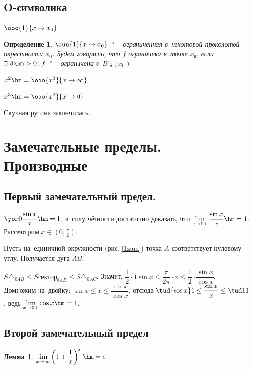 \documentclass[a4paper,10pt,twoside]{article}
\newtheorem{Def}{Определение}[section]
\newtheorem{Th}{Лемма}[section]
\let\AVsection\section{}
\renewcommand\section{\newpage\scol\AVsection}
\newcommand{\scol}{  \renewcommand{\headrulewidth}{0.5pt}\fancyhead[RE,LO]{\thesection{} \leftmark} \fancyhead[LE,RO]{\thepage}}
\begin{document}
\subsection{O-символика}

$\ooo{1}{x\to x_0}$

\begin{Def} \label{ot}   $\ouu{1}{x\to x_0}$ "--- ограниченная в~некоторой проколотой окрестности $x_0$.
    Будем говорить, что $f$ ограничена в~точке $x_0$, если $\exists\  \delta\hm>0\colon f$ "--- ограничена в~$B'_\delta(x_0)$

    \end{Def}

    $x^2\hm=\ooo{x^3}{x\to\infty}$

    $x^3\hm=\ooo{x^2}{x\to0}$

    Скучная рутина закончилась.
\section{Замечательные пределы. Производные}
\subsection{Первый замечательный предел.}
$\yo x0\dfrac{\sin x}{x}\hm=1$, в~силу чётности достаточно доказать, что $\lim\limits_{x\to0+}\dfrac{\sin x}{x}\hm=1$. Рассмотрим $x\in\left(0,\frac{\pi}2\right)$.


Пусть на~единичной окружности (рис. \ref{1zam}) точка $A$ соответствует нулевому углу. Получается дуга $AB$.

$S\triangle_{0AB}\leq S\text{сектор}_{0AB}\leq S\triangle_{0AC}$. Значит, $\dfrac12\cdot1\sin x\leq\dfrac{\pi}{2\pi}\cdot x\leq\dfrac12\cdot\dfrac{\sin x}{\cos x}$.
Домножим на~двойку: $\sin x\leq x\leq \dfrac{\sin x}{\cos x}$, отсюда $\tud{\cos x}1\leq\dfrac{\sin x}{x}\leq\tud11$, ведь $\lim\limits_{x\to0+}{\cos x}\hm=1$.

\subsection{Второй замечательный предел}
\begin{Th}
    $\lim\limits_{x\to\infty}\left(1+\dfrac1x\right)^x\hm=e$
\end{Th}
\end{document}
